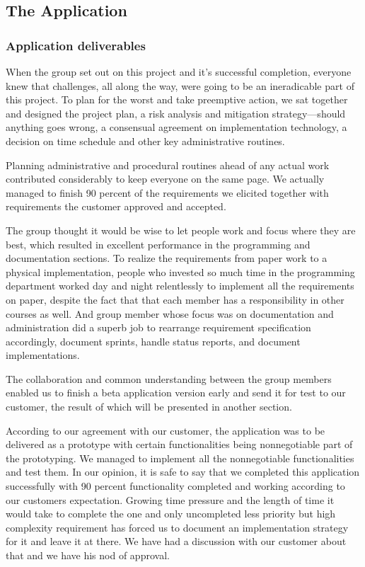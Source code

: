 \subsection{The Application}
	
    \subsubsection{Application deliverables}
    When the group set out on this project and it's successful completion, everyone knew that challenges, all along the way, were going to be an ineradicable part of this project. To plan for the worst and take preemptive action, we sat together and designed the project plan, a risk analysis and mitigation strategy---should anything goes wrong, a consensual agreement on implementation technology, a decision on time schedule and other key administrative routines.

    Planning administrative and procedural routines ahead of any actual work contributed considerably to keep everyone on the same page. We actually managed to finish 90 percent of the requirements we elicited together with requirements the customer approved and accepted.

    The group thought it would be wise to let people work and focus where they are best, which resulted in excellent performance in the programming and documentation sections. To realize the requirements from paper work to a physical implementation, people who invested so much time in the programming department worked day and night relentlessly to implement all the requirements on paper, despite the fact that that each member has a responsibility in other courses as well. And group member whose focus was on documentation and administration did a superb job to rearrange requirement specification accordingly, document sprints, handle status reports, and document implementations.

    The collaboration and common understanding between the group members enabled us to finish a beta application version early and send it for test to our customer, the result of which will be presented in another section.

    According to our agreement with our customer, the application was to be delivered as a prototype with certain functionalities being nonnegotiable part of the prototyping. We managed to implement all the nonnegotiable functionalities and test them. In our opinion, it is safe to say that we completed this application successfully with 90 percent functionality completed and working according to our customers expectation. Growing time pressure and the length of time it would take to complete the one and only uncompleted less priority but high complexity requirement has forced us to document an implementation strategy for it and leave it at there. We have had a discussion with our customer about that and we have his nod of approval.

